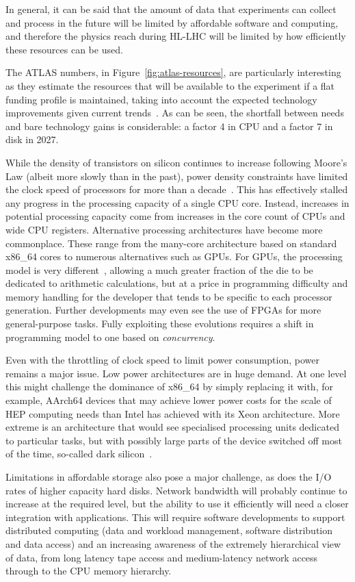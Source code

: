In general, it can be said that the amount of data that experiments can
collect and process in the future will be limited by affordable software
and computing, and therefore the physics reach during HL-LHC will be
limited by how efficiently these resources can be used.

The ATLAS numbers, in Figure~\ref{fig:atlas-resources}, are particularly interesting as they
estimate the resources that will be available to the experiment if a
flat funding profile is maintained, taking into account the expected
technology improvements given current trends~\cite{Panzer2017}. As can be
seen, the shortfall between needs and bare technology gains is
considerable: a factor 4 in CPU and a factor 7 in disk in 2027.

While the density of transistors on silicon continues to increase
following Moore's Law (albeit more slowly than in the past), power
density constraints have limited the clock speed of processors for more
than a decade~\cite{NAP12980}. This has effectively stalled any progress in the
processing capacity of a single CPU core. Instead, increases in
potential processing capacity come from increases in the core count of
CPUs and wide CPU registers. Alternative processing architectures have
become more commonplace. These range from the many-core architecture
based on standard x86\_64 cores to numerous alternatives such as GPUs.
For GPUs, the processing model is very different~\cite{Cook:2012:CPD:2430671}, allowing a much
greater fraction of the die to be dedicated to arithmetic calculations,
but at a price in programming difficulty and memory handling for the
developer that tends to be specific to each processor generation.
Further developments may even see the use of FPGAs for more
general-purpose tasks. Fully exploiting these evolutions requires a
shift in programming model to one based on \emph{concurrency}.

Even with the throttling of clock speed to limit power consumption,
power remains a major issue. Low power architectures are in huge demand.
At one level this might challenge the dominance of x86\_64 by simply
replacing it with, for example, AArch64 devices that may achieve lower power
costs for the scale of HEP computing needs than Intel has achieved with its
Xeon architecture. More extreme is an architecture that would see
specialised processing units dedicated to particular tasks, but with
possibly large parts of the device switched off most of the time,
so-called dark silicon~\cite{IntelCSA}.

Limitations in affordable storage also pose a major challenge, as does
the I/O rates of higher capacity hard disks. Network
bandwidth will probably continue to increase at the required level, but
the ability to use it efficiently will need a closer integration with
applications. This will require software developments to
support distributed computing (data and workload management, software
distribution and data access) and an increasing awareness of the
extremely hierarchical view of data, from long latency tape access and
medium-latency network access through to the CPU memory hierarchy.


